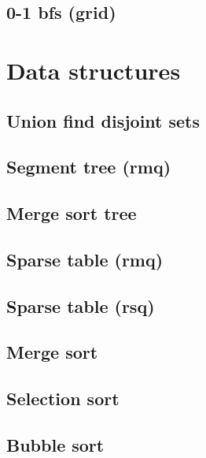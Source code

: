 \subsection{0-1 bfs (grid)}
\raggedbottom
\hrulefill


\section{Data structures}
\subsection{Union find disjoint sets}
\raggedbottom
\hrulefill
\subsection{Segment tree (rmq)}
\raggedbottom
\hrulefill
\subsection{Merge sort tree}
\raggedbottom
\hrulefill
\subsection{Sparse table (rmq)}
\raggedbottom
\hrulefill
\subsection{Sparse table (rsq)}
\raggedbottom
\hrulefill
\subsection{Merge sort}
\raggedbottom
\hrulefill
\subsection{Selection sort}
\raggedbottom
\hrulefill
\subsection{Bubble sort}
\raggedbottom
\hrulefill


